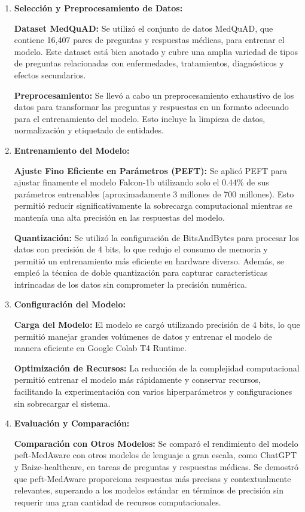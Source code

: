		\begin{enumerate}
			\item \textbf{Selección y Preprocesamiento de Datos:}
			
				\subitem \textbf{Dataset MedQuAD:} Se utilizó el conjunto de datos MedQuAD, que contiene 16,407 pares de preguntas y 	respuestas médicas, para entrenar el modelo. Este dataset está bien anotado y cubre una amplia variedad de tipos de preguntas relacionadas con enfermedades, tratamientos, diagnósticos y efectos secundarios.
				
				\subitem \textbf{Preprocesamiento:} Se llevó a cabo un preprocesamiento exhaustivo de los datos para transformar las 	preguntas y respuestas en un formato adecuado para el entrenamiento del modelo. Esto incluye la limpieza de datos, normalización y etiquetado de entidades.
			
			\item \textbf{Entrenamiento del Modelo:}
			
				\subitem \textbf{Ajuste Fino Eficiente en Parámetros (PEFT):} Se aplicó PEFT para ajustar finamente el modelo Falcon-1b utilizando solo el 0.44\% de sus parámetros entrenables (aproximadamente 3 millones de 700 millones). Esto permitió reducir significativamente la sobrecarga computacional mientras se mantenía una alta precisión en las respuestas del modelo.
			
				\subitem \textbf{Quantización:} Se utilizó la configuración de BitsAndBytes para procesar los datos con precisión de 4 bits, lo que redujo el consumo de memoria y permitió un entrenamiento más eficiente en hardware diverso. Además, se empleó la técnica de doble quantización para capturar características intrincadas de los datos sin comprometer la precisión numérica.
			
			\item \textbf{Configuración del Modelo:}
			
				\subitem \textbf{Carga del Modelo:} El modelo se cargó utilizando precisión de 4 bits, lo que permitió manejar grandes volúmenes de datos y entrenar el modelo de manera eficiente en Google Colab T4 Runtime.
		
				\subitem \textbf{Optimización de Recursos:} La reducción de la complejidad computacional permitió entrenar el modelo más rápidamente y conservar recursos, facilitando la experimentación con varios hiperparámetros y configuraciones sin sobrecargar el sistema.
			
			\item \textbf{Evaluación y Comparación:}
			
				\subitem \textbf{Comparación con Otros Modelos:} Se comparó el rendimiento del modelo peft-MedAware con otros modelos de lenguaje a gran escala, como ChatGPT y Baize-healthcare, en tareas de preguntas y respuestas médicas. Se demostró que peft-MedAware proporciona respuestas más precisas y contextualmente relevantes, superando a los modelos estándar en términos de precisión sin requerir una gran cantidad de recursos computacionales.
			
		\end{enumerate}
	
